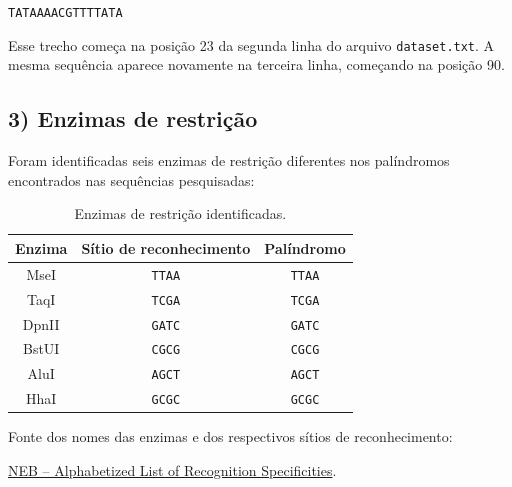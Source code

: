 \documentclass[a4paper,12pt]{article}
\begin{document}
\begin{center}
\texttt{TATAAAACGTTTTATA}
\end{center}

Esse trecho começa na posição 23 da segunda linha do arquivo \texttt{dataset.txt}. A mesma sequência aparece novamente na terceira linha, começando na posição 90.

\subsection*{3) Enzimas de restrição}

Foram identificadas seis enzimas de restrição diferentes nos palíndromos encontrados nas sequências pesquisadas:

\begin{table}[h]
\centering
\caption{Enzimas de restrição identificadas.}
\begin{tabular}{|c|c|c|}
\hline
\textbf{Enzima} & \textbf{Sítio de reconhecimento} & \textbf{Palíndromo} \\
\hline
MseI  & \texttt{TTAA} & \texttt{TTAA} \\
\hline
TaqI  & \texttt{TCGA} & \texttt{TCGA} \\
\hline
DpnII & \texttt{GATC} & \texttt{GATC} \\
\hline
BstUI & \texttt{CGCG} & \texttt{CGCG} \\
\hline
AluI  & \texttt{AGCT} & \texttt{AGCT} \\
\hline
HhaI  & \texttt{GCGC} & \texttt{GCGC} \\
\hline
\end{tabular}
\end{table}

Fonte dos nomes das enzimas e dos respectivos sítios de reconhecimento:

\href{https://www.neb.com/en/tools-and-resources/selection-charts/alphabetized-list-of-recognition-specificities}
{NEB -- Alphabetized List of Recognition Specificities}.
\end{document}
